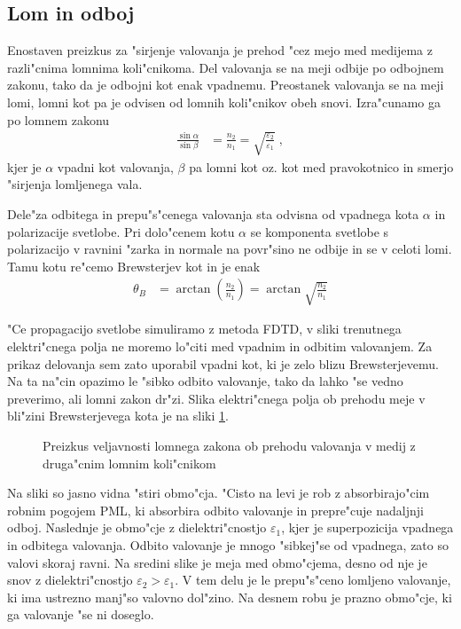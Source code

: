 \documentclass[a4paper,10pt]{article}
\begin{document}
\subsection{Lom in odboj}
Enostaven preizkus za "sirjenje valovanja je prehod "cez mejo med medijema z razli"cnima lomnima koli"cnikoma. 
Del valovanja se na meji odbije po odbojnem zakonu, tako da je odbojni kot enak vpadnemu. 
Preostanek valovanja se na meji lomi, lomni kot pa je odvisen od lomnih koli"cnikov obeh snovi. 
Izra"cunamo ga po lomnem zakonu
\begin{align}
 \frac{\sin\alpha}{\sin\beta} &= \frac{n_2}{n_1} = \sqrt{\frac{\varepsilon_2}{\varepsilon_1}}\;, 
\end{align}
kjer je $\alpha$ vpadni kot valovanja, $\beta$ pa lomni kot oz. kot med pravokotnico in smerjo "sirjenja lomljenega vala. 

Dele"za odbitega in prepu"s"cenega valovanja sta odvisna od vpadnega kota $\alpha$ in polarizacije svetlobe\cite{wiki:brewster}. 
Pri dolo"cenem kotu $\alpha$ se komponenta svetlobe s polarizacijo v ravnini "zarka in normale na povr"sino ne odbije in se v celoti lomi. 
Tamu kotu re"cemo Brewsterjev kot in je enak
\begin{align}
 \theta_B &= \arctan\left(\frac{n_2}{n_1}\right) = \arctan\sqrt{\frac{n_2}{n_1}}
\end{align}

"Ce propagacijo svetlobe simuliramo z metoda \ac{FDTD}, v sliki trenutnega elektri"cnega polja ne moremo lo"citi med vpadnim in odbitim valovanjem. 
Za prikaz delovanja sem zato uporabil vpadni kot, ki je zelo blizu Brewsterjevemu. 
Na ta na"cin opazimo le "sibko odbito valovanje, tako da lahko "se vedno preverimo, ali lomni zakon dr"zi. 
Slika elektri"cnega polja ob prehodu meje v bli"zini Brewsterjevega kota je na sliki \ref{fig:refraction-test}. 

\begin{figure}[h]
 \centering
 \vspace{-1.4cm}
 
 \vspace{-1.7cm}
 \caption{Preizkus veljavnosti lomnega zakona ob prehodu valovanja v medij z druga"cnim lomnim koli"cnikom}
 \label{fig:refraction-test}
\end{figure}

Na sliki so jasno vidna "stiri obmo"cja. "Cisto na levi je rob z absorbirajo"cim robnim pogojem \ac{PML}, ki absorbira odbito valovanje in prepre"cuje nadaljnji odboj. 
Naslednje je obmo"cje z dielektri"cnostjo $\varepsilon_1$, kjer je superpozicija vpadnega in odbitega valovanja. 
Odbito valovanje je mnogo "sibkej"se od vpadnega, zato so valovi skoraj ravni. 
Na sredini slike je meja med obmo"cjema, desno od nje je snov z dielektri"cnostjo $\varepsilon_2 > \varepsilon_1$.
V tem delu je le prepu"s"ceno lomljeno valovanje, ki ima ustrezno manj"so valovno dol"zino. 
Na desnem robu je prazno obmo"cje, ki ga valovanje "se ni doseglo. 
\end{document}
